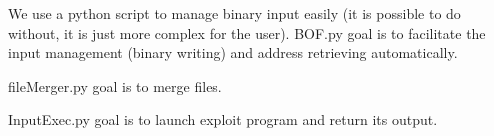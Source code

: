 \documentclass[a4paper, 11pt]{article}
\begin{document}
We use a python script to manage binary input easily (it is possible to do without, it is just more complex for the user). 
BOF.py goal is to facilitate the input management (binary writing) and address retrieving automatically.

fileMerger.py goal is to merge files.

InputExec.py goal is to launch exploit program and return its output.

\end{document}
